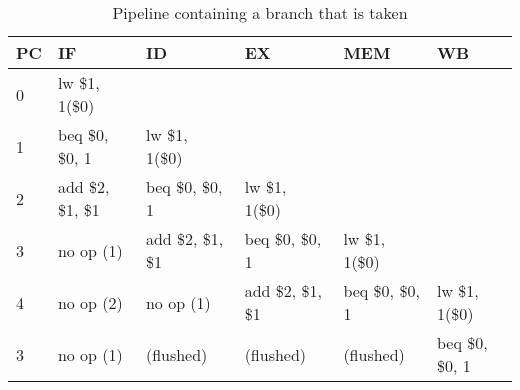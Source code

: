 \begin{table}[h]
    \begin{tabular}{l|lllll}
    PC & IF                 & ID                 & EX                 & MEM              & WB               \\ \hline
    0  & lw   \$1, 1(\$0)   & ~                  & ~                  & ~                & ~                \\
    1  & beq  \$0, \$0, 1   & lw   \$1, 1(\$0)   & ~                  & ~                & ~                \\
    2  & add  \$2, \$1, \$1 & beq  \$0, \$0, 1   & lw   \$1, 1(\$0)   & ~                & ~                \\
    3  & no op (1)          & add  \$2, \$1, \$1 & beq  \$0, \$0, 1   & lw   \$1, 1(\$0) & ~                \\
    4  & no op (2)          & no op (1)          & add  \$2, \$1, \$1 & beq  \$0, \$0, 1 & lw   \$1, 1(\$0) \\
    3  & no op (1)          & (flushed)          & (flushed)          & (flushed)        & beq  \$0, \$0, 1 \\
    \end{tabular}
\caption{Pipeline containing a branch that is taken}
\label{tbl:branching}
\end{table}


